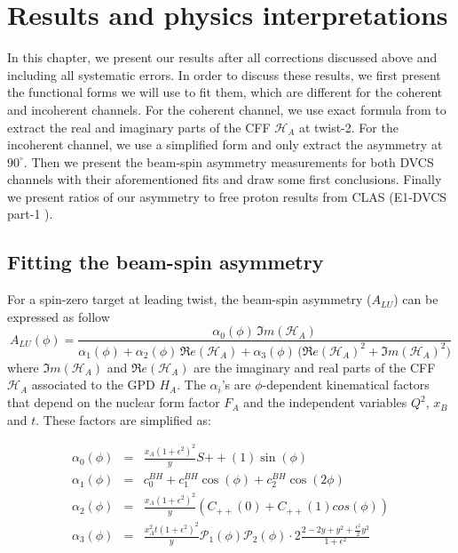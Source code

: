 \chapter{Results and physics interpretations}
In this chapter, we present our results after all corrections discussed above and including
all systematic errors. In order to discuss these results, we first present the functional forms
we will use to fit them, which are different for the coherent and incoherent 
channels. For the coherent channel, we use exact formula from \cite{FX_BSA} to 
extract the real and imaginary parts
of the CFF $\mathcal{H}_{A}$ at twist-2. For the incoherent channel, we use a simplified form 
and only extract the asymmetry at $90^{\circ}$. Then we present the beam-spin asymmetry 
measurements for both DVCS channels with their aforementioned fits and draw some first 
conclusions. Finally we present ratios of our asymmetry to free proton results 
from CLAS (E1-DVCS part-1 \cite{FX_BSA, FX_analysis_note}).

\section{Fitting the beam-spin asymmetry} \label{Beam-Spin}
For a spin-zero target at leading twist, the beam-spin asymmetry ($A_{LU}$) 
can be expressed as follow \cite{BM_2009}
\begin{equation}
A_{LU}(\phi) = \frac{\alpha_{0}(\phi) \, \Im m(\mathcal{H}_{A})}
{\alpha_{1}(\phi) + \alpha_{2}(\phi) \, \Re e(\mathcal{H}_{A}) + \alpha_{3}(\phi) \, 
\big( 
\Re e(\mathcal{H}_{A})^{2} + \Im m(\mathcal{H}_{A})^{2} \big)}
\label{eq:A_LU-coh}
\end{equation}
where $\Im m(\mathcal{H}_{A})$ and $\Re e(\mathcal{H}_{A})$ are the imaginary 
and real parts of the CFF $\mathcal{H}_{A}$ associated to the GPD $H_A$. The 
$\alpha_{i}$'s are $\phi$-dependent kinematical factors that depend on the 
nuclear form factor $F_A$ and the independent variables $Q^2$, $x_{B}$ and $t$.  
These factors are simplified as:

\small
\begin{eqnarray}
   \alpha_0 (\phi) & = &\frac{x_{A}(1+\epsilon^2)^2}{y} S{++}(1) \sin(\phi)\\
    \alpha_1 (\phi) & = & c_0^{BH}+c_1^{BH} \cos({\phi})+c_2^{BH} \cos(2\phi)\\ 
   \alpha_2 (\phi) & = & \frac{x_{A}(1+\epsilon^2)^2}{y}  \left( C_{++}(0) +  
C_{++}(1) cos(\phi) \right)\\
\alpha_3 (\phi) &=& \frac{x^{2}_{A}t(1+\epsilon^2)^2}{y} {\mathcal P}_1(\phi) 
{\mathcal P}_2(\phi) \cdot 2 \frac{2-2y+y^2 + \frac{\epsilon^2}{2}y^2}{1 + 
\epsilon^2}
\end{eqnarray}
\normalsize

